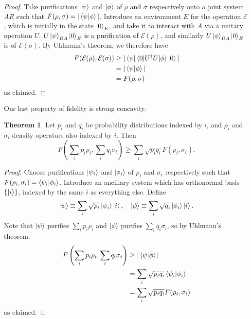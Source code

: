 \documentclass[12pt,a4paper]{report}
\numberwithin{equation}{section}
\theoremstyle{definition}
\theoremstyle{theorem}
\newtheorem{theorem}{Theorem}[section]
\theoremstyle{theorem}
\theoremstyle{example}
\theoremstyle{definition}
\begin{document}
\begin{proof}
	Take purifications $\ket{\psi}$ and $\ket{\phi}$ of $\rho$ and $\sigma$ respectively onto a joint system $AR$ such that $F(\rho,\sigma)=|\braket{\psi|\phi}|$. Introduce an environment $E$ for the operation $\mathcal{E}$, which is initially in the state $\ket{0}_{E}$, and take it to interact with $A$ via a unitary operation $U$. $U\ket{\psi}_{RA}\ket{0}_{E}$ is a purification of $\mathcal{E}(\rho)$, and similarly $U\ket{\phi}_{RA}\ket{0}_{E}$ is of $\mathcal{E}(\sigma)$. By Uhlmann's theorem, we therefore have
	\begin{equation}
		\begin{aligned}
			F(\mathcal{E}(\rho),\mathcal{E}(\sigma))&\geq|\bra{\psi}\braket{0|U^{\dagger}U|\phi}\ket{0}|\\&=|\braket{\psi|\phi}|\\&=F(\rho,\sigma)
		\end{aligned}
	\end{equation}
	as claimed.
\end{proof}
Our last property of fidelity is strong concavity.
\begin{theorem}
	Let $p_{i}$ and $q_{i}$ be probability distributions indexed by $i$, and $\rho_{i}$ and $\sigma_{i}$ density operators also indexed by $i$. Then
	\begin{equation}
		F\left(\sum_{i}p_{i}\rho_{i},\sum_{i}q_{i}\sigma_{i}\right)\geq\sum_{i}\sqrt{p_{i}q_{i}}F(\rho_{i},\sigma_{i}).
	\end{equation}
\end{theorem}
\begin{proof}
	Choose purifications $\ket{\psi_{i}}$ and $\ket{\phi_{i}}$ of $\rho_{i}$ and $\sigma_{i}$ respectively such that $F(\rho_{i},\sigma_{i})=\braket{\psi_{i}|\phi_{i}}$. Introduce an ancillary system which has orthonormal basis $\{\ket{i}\}$, indexed by the same $i$ as everything else. Define
	\begin{equation}
		\ket{\psi}\equiv\sum_{i}\sqrt{p_{i}}\ket{\psi_{i}}\ket{i},\quad\ket{\phi}\equiv\sum_{i}\sqrt{q_{i}}\ket{\phi_{i}}\ket{i}.
	\end{equation}
	Note that $\ket{\psi}$ purifies $\sum_{i}p_{i}\rho_{i}$ and $\ket{\phi}$ purifies $\sum_{i}q_{i}\sigma_{i}$, so by Uhlmann's theorem:
	\begin{equation}
		\begin{aligned}
			F\left(\sum_{i}p_{i}\rho_{i},\sum_{i}q_{i}\sigma_{i}\right)&\geq|\braket{\psi|\phi}|\\&=\sum_{i}\sqrt{p_{i}q_{i}}\braket{\psi_{i}|\phi_{i}}\\&=\sum_{i}\sqrt{p_{i}q_{i}}F(\rho_{i},\sigma_{i})
		\end{aligned}
	\end{equation}
	as claimed.
\end{proof}
\end{document}
